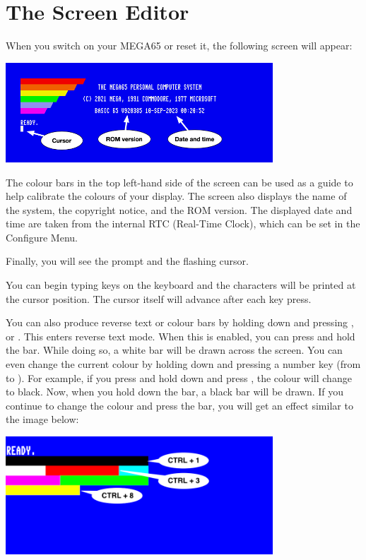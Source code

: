 \section{The Screen Editor}
\label{sec:screen-editor}

When you switch on your MEGA65 or reset it, the following screen will appear:

\begin{center}
\includegraphics[width={10cm}]{images/introduction-screen/layout.png}
\end{center}

The colour bars in the top left-hand side of the screen can be used
as a guide to help calibrate the colours of your display.
The screen also displays the name of the system,
the copyright notice, and the ROM version.
The displayed date and time are taken from the internal RTC
(Real-Time Clock), which can be set in the Configure Menu.

Finally, you will see the  prompt and the flashing cursor.

You can begin typing keys on the keyboard and the characters will be
printed at the cursor position. The cursor itself will advance after
each key press.

You can also produce reverse text or colour bars by holding down  and pressing , or . This enters reverse text mode. When this is enabled, you can press and hold the  bar. While doing so, a white bar will be drawn across the screen.
You can even change the current colour by holding  down and pressing a number key (from  to ). For example, if you press and hold  down and press , the colour will change to black. Now, when you hold down the  bar, a black bar will be drawn. If you continue to change the colour and press the  bar, you will get an effect similar to the image below:


\begin{center}
\includegraphics[width={10cm}]{images/introduction-screen/colour-bars.png}
\end{center}


